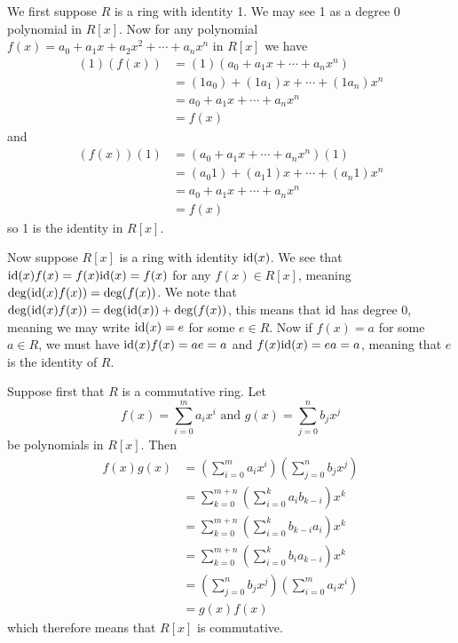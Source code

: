 \begin{questions}
    \item \begin{partquestions}{\alph*}
        \item We first suppose $R$ is a ring with identity 1. We may see 1 as a degree 0 polynomial in $R[x]$. Now for any polynomial $f(x) = a_0+a_1x+a_2x^2+\cdots+a_nx^n$ in $R[x]$ we have
        \begin{align*}
            (1)(f(x)) &= (1)(a_0+a_1x+\cdots+a_nx^n)\\
            &= (1a_0)+(1a_1)x+\cdots+(1a_n)x^n\\
            &= a_0+a_1x+\cdots+a_nx^n\\
            &= f(x)
        \end{align*}
        and
        \begin{align*}
            (f(x))(1) &= (a_0+a_1x+\cdots+a_nx^n)(1)\\
            &= (a_{0}1)+(a_{1}1)x+\cdots+(a_{n}1)x^n\\
            &= a_0+a_1x+\cdots+a_nx^n\\
            &= f(x)
        \end{align*}
        so 1 is the identity in $R[x]$.

        Now suppose $R[x]$ is a ring with identity $\mathrm{id}(x)$. We see that $\mathrm{id}(x)f(x) = f(x)\mathrm{id}(x) = f(x)$ for any $f(x) \in R[x]$, meaning $\deg(\mathrm{id}(x)f(x)) = \deg(f(x))$. We note that $\deg(\mathrm{id}(x)f(x)) = \deg(\mathrm{id}(x)) + \deg(f(x))$, this means that $\mathrm{id}$ has degree 0, meaning we may write $\mathrm{id}(x) = e$ for some $e \in R$. Now if $f(x) = a$ for some $a \in R$, we must have $\mathrm{id}(x)f(x) = ae = a$ and $f(x)\mathrm{id}(x) = ea = a$, meaning that $e$ is the identity of $R$.
        
        \item Suppose first that $R$ is a commutative ring. Let
        \[
            f(x) = \sum_{i=0}^ma_ix^i \text{ and } g(x) = \sum_{j=0}^nb_jx^j
        \]
        be polynomials in $R[x]$. Then
        \begin{align*}
            f(x)g(x) &= \left(\sum_{i=0}^ma_ix^i\right)\left(\sum_{j=0}^nb_jx^j\right)\\
            &= \sum_{k=0}^{m+n}\left(\sum_{i=0}^k a_{i}b_{k-i}\right)x^k\\
            &= \sum_{k=0}^{m+n}\left(\sum_{i=0}^k b_{k-i}a_{i}\right)x^k\\
            &= \sum_{k=0}^{m+n}\left(\sum_{i=0}^k b_{i}a_{k-i}\right)x^k\\
            &= \left(\sum_{j=0}^nb_jx^j\right)\left(\sum_{i=0}^ma_ix^i\right)\\
            &= g(x)f(x)
        \end{align*}
        which therefore means that $R[x]$ is commutative.


\end{partquestions}
\end{questions}
